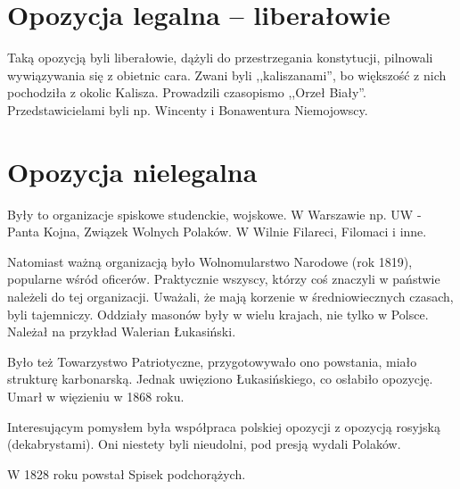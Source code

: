 \documentclass [a4paper, 11pt, oneside]{book}
\begin{document}
    \section{Opozycja legalna -- liberałowie} %
    \label{sec:opozycja_legalna}
        Taką opozycją byli liberałowie, dążyli do przestrzegania konstytucji, pilnowali wywiązywania się z obietnic cara. Zwani byli ,,kaliszanami'', bo większość z nich pochodziła z okolic Kalisza. Prowadzili czasopismo ,,Orzeł Biały''. Przedstawicielami byli np. Wincenty i Bonawentura Niemojowscy.
    \section{Opozycja nielegalna} %
    \label{sec:opozycja_nielegalna_}
        Były to organizacje spiskowe studenckie, wojskowe. W Warszawie np. UW - Panta Kojna, Związek Wolnych Polaków. W Wilnie Filareci, Filomaci i inne.

        Natomiast ważną organizacją było Wolnomularstwo Narodowe (rok 1819), popularne wśród oficerów. Praktycznie wszyscy, którzy coś znaczyli w państwie należeli do tej organizacji. Uważali, że mają korzenie w średniowiecznych czasach, byli tajemniczy. Oddziały masonów były w wielu krajach, nie tylko w Polsce. Należał na przykład Walerian Łukasiński.

        Było też Towarzystwo Patriotyczne, przygotowywało ono powstania, miało strukturę karbonarską. Jednak uwięziono Łukasińskiego, co osłabiło opozycję. Umarł w więzieniu w 1868 roku.

        Interesującym pomysłem była współpraca polskiej opozycji z opozycją rosyjską (dekabrystami). Oni niestety byli nieudolni, pod presją wydali Polaków.

        W 1828 roku powstał Spisek podchorążych.
\end{document}
